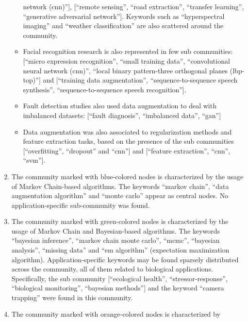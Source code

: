 \documentclass[parskip=full]{scrartcl}
\begin{document}
\begin{enumerate}
\begin{itemize}
                network (cnn)''], [``remote sensing'', ``road extraction'',
                ``transfer learning'', ``generative adversarial network''].
                Keywords such as ``hyperspectral imaging'' and ``weather
                classification'' are also scattered around the community.
            \item Facial recognition research is also represented in few sub
                communities: [``micro expression recognition'', ``small
                training data'', ``convolutional neural network (cnn)'', ``local
                binary pattern-three orthogonal planes (lbp-top)''] and
                [``training data augmentation'', ``sequence-to-sequence speech
                synthesis'', ``sequence-to-sequence speech recognition''].
            \item Fault detection studies also used data augmentation to deal
                with imbalanced datasets: [``fault diagnosis'', ``imbalanced
                data'', ``gan'']
            \item Data augmentation was also associated to regularization
                methods and feature extraction tasks, based on the presence of
                the sub communities [``overfitting'', ``dropout'' and ``cnn'']
                and [``feature extraction'', ``cnn'', ``svm''].
        \end{itemize}
    \item The community marked with blue-colored nodes is characterized by the
        usage of Markov Chain-based algorithms. The keywords ``markov chain'',
        ``data augmentation algorithm'' and ``monte carlo'' appear as central
        nodes. No application-specific sub-community was found.
    \item The community marked with green-colored nodes is characterized by
        the usage of Markov Chain and Bayesian-based algorithms. The keywords
        ``bayesian inference'', ``markov chain monte carlo'', ``mcmc'',
        ``bayesian analysis'', ``missing data'' and ``em algorithm''
        (expectation maximization algorithm). Application-specific keywords
        may be found sparsely distributed across the community, all of them
        related to biological applications. Specifically, the sub community
        [``ecological health'', ``stressor-response'', ``biological
        monitoring'', ``bayesian methods''] and the keyword ``camera
        trapping'' were found in this community. 
    \item The community marked with orange-colored nodes is characterized by

\end{enumerate}
\end{document}
